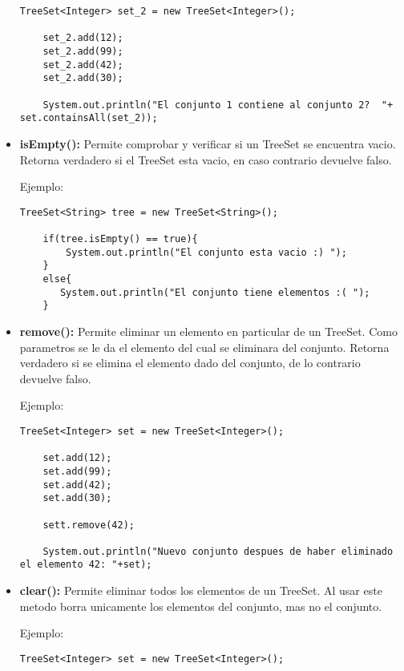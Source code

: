 \documentclass[12pt, letterpaper]{article} %
\begin{document}
\begin{itemize}
\begin{lstlisting}[frame=single]
    TreeSet<Integer> set_2 = new TreeSet<Integer>();

    set_2.add(12);
    set_2.add(99);
    set_2.add(42);
    set_2.add(30);

    System.out.println("El conjunto 1 contiene al conjunto 2?  "+ set.containsAll(set_2));
    \end{lstlisting}

    \item \textbf{isEmpty():} Permite comprobar y verificar si un TreeSet se encuentra vacio. Retorna verdadero si el TreeSet esta vacio, en caso contrario devuelve falso.
    
    Ejemplo:
    \lstset{language = Java, breaklines=true, basicstyle=\footnotesize}
    \begin{lstlisting}[frame=single]
    TreeSet<String> tree = new TreeSet<String>();

    if(tree.isEmpty() == true){
        System.out.println("El conjunto esta vacio :) ");
    }
    else{
	   System.out.println("El conjunto tiene elementos :( ");
    }
    \end{lstlisting}

    \item \textbf{remove():} Permite eliminar un elemento en particular de un TreeSet. Como parametros se le da el elemento del cual se eliminara del conjunto. Retorna verdadero si se elimina el elemento dado del conjunto, de lo contrario devuelve falso.
    
    Ejemplo:
    \lstset{language = Java, breaklines=true, basicstyle=\footnotesize}
    \begin{lstlisting}[frame=single]
    TreeSet<Integer> set = new TreeSet<Integer>();

    set.add(12);
    set.add(99);
    set.add(42);
    set.add(30);

    sett.remove(42);

    System.out.println("Nuevo conjunto despues de haber eliminado el elemento 42: "+set);
    \end{lstlisting}

    \item \textbf{clear():} Permite eliminar todos los elementos de un TreeSet. Al usar este metodo borra unicamente los elementos del conjunto, mas no el conjunto.

    Ejemplo:
    \lstset{language = Java, breaklines=true, basicstyle=\footnotesize}
    \begin{lstlisting}[frame=single]
    TreeSet<Integer> set = new TreeSet<Integer>();


\end{lstlisting}
\end{itemize}
\end{document}
